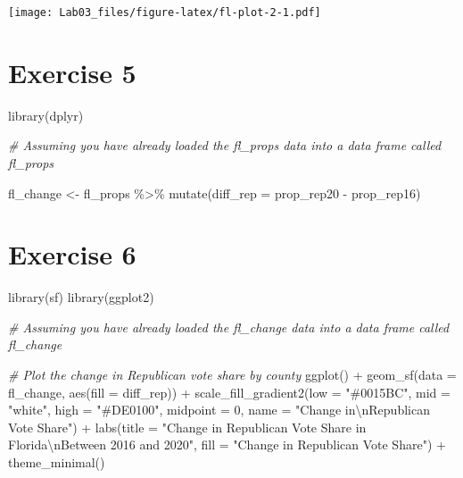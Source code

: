 \documentclass[
]{article}
\newenvironment{Shaded}{\begin{snugshade}}{\end{snugshade}}
\newcommand{\AttributeTok}[1]{\textcolor[rgb]{0.77,0.63,0.00}{#1}}
\newcommand{\CommentTok}[1]{\textcolor[rgb]{0.56,0.35,0.01}{\textit{#1}}}
\newcommand{\DecValTok}[1]{\textcolor[rgb]{0.00,0.00,0.81}{#1}}
\newcommand{\FunctionTok}[1]{\textcolor[rgb]{0.00,0.00,0.00}{#1}}
\newcommand{\NormalTok}[1]{#1}
\newcommand{\OtherTok}[1]{\textcolor[rgb]{0.56,0.35,0.01}{#1}}
\newcommand{\SpecialCharTok}[1]{\textcolor[rgb]{0.00,0.00,0.00}{#1}}
\newcommand{\StringTok}[1]{\textcolor[rgb]{0.31,0.60,0.02}{#1}}
\begin{document}
\texttt{[image: Lab03\_files/figure-latex/fl-plot-2-1.pdf]}

\hypertarget{exercise-5}{%
\section{Exercise 5}\label{exercise-5}}

\begin{Shaded}
\begin{Highlighting}[]
\FunctionTok{library}\NormalTok{(dplyr)}

\CommentTok{\# Assuming you have already loaded the fl\_props data into a data frame called \textquotesingle{}fl\_props\textquotesingle{}}

\NormalTok{fl\_change }\OtherTok{\textless{}{-}}\NormalTok{ fl\_props }\SpecialCharTok{\%\textgreater{}\%}
  \FunctionTok{mutate}\NormalTok{(}\AttributeTok{diff\_rep =}\NormalTok{ prop\_rep20 }\SpecialCharTok{{-}}\NormalTok{ prop\_rep16)}
\end{Highlighting}
\end{Shaded}

\hypertarget{exercise-6}{%
\section{Exercise 6}\label{exercise-6}}

\begin{Shaded}
\begin{Highlighting}[]
\FunctionTok{library}\NormalTok{(sf)}
\FunctionTok{library}\NormalTok{(ggplot2)}

\CommentTok{\# Assuming you have already loaded the fl\_change data into a data frame called \textquotesingle{}fl\_change\textquotesingle{}}

\CommentTok{\# Plot the change in Republican vote share by county}
\FunctionTok{ggplot}\NormalTok{() }\SpecialCharTok{+}
  \FunctionTok{geom\_sf}\NormalTok{(}\AttributeTok{data =}\NormalTok{ fl\_change, }\FunctionTok{aes}\NormalTok{(}\AttributeTok{fill =}\NormalTok{ diff\_rep)) }\SpecialCharTok{+}
  \FunctionTok{scale\_fill\_gradient2}\NormalTok{(}\AttributeTok{low =} \StringTok{"\#0015BC"}\NormalTok{, }\AttributeTok{mid =} \StringTok{"white"}\NormalTok{, }\AttributeTok{high =} \StringTok{"\#DE0100"}\NormalTok{, }\AttributeTok{midpoint =} \DecValTok{0}\NormalTok{,}
                      \AttributeTok{name =} \StringTok{"Change in}\SpecialCharTok{\textbackslash{}n}\StringTok{Republican Vote Share"}\NormalTok{) }\SpecialCharTok{+}
  \FunctionTok{labs}\NormalTok{(}\AttributeTok{title =} \StringTok{"Change in Republican Vote Share in Florida}\SpecialCharTok{\textbackslash{}n}\StringTok{Between 2016 and 2020"}\NormalTok{,}
       \AttributeTok{fill =} \StringTok{"Change in Republican Vote Share"}\NormalTok{) }\SpecialCharTok{+}
  \FunctionTok{theme\_minimal}\NormalTok{()}
\end{Highlighting}
\end{Shaded}
\end{document}
